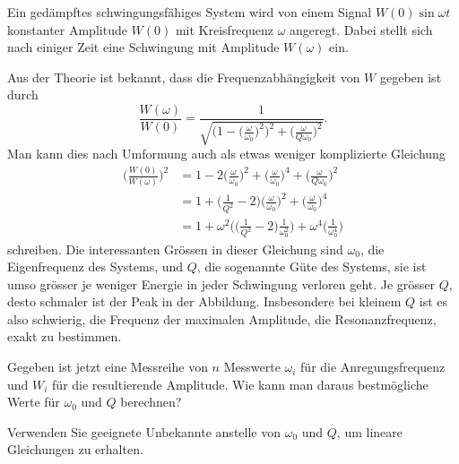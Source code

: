 Ein gedämpftes schwingungsfähiges System wird von einem Signal
$W(0)\sin\omega t$
konstanter Amplitude $W(0)$ mit Kreisfrequenz $\omega$ angeregt.
Dabei stellt sich nach einiger Zeit eine Schwingung mit Amplitude $W(\omega)$
ein.
\begin{center}
\end{center}
Aus der Theorie ist bekannt, dass die Frequenzabhängigkeit von $W$
gegeben ist durch
\begin{equation}
\frac{W(\omega)}{W(0)}
=
\frac{1}{\sqrt{\biggl(1-\biggl(\displaystyle\frac{\omega}{\omega_0}\biggr)^2\biggr)^2
+
\biggl(\displaystyle\frac{\omega}{Q\omega_0}\biggr)^2}}.
\end{equation}
Man kann dies nach Umformung auch als etwas weniger komplizierte Gleichung
\begin{equation}
\begin{aligned}
\biggl(
\frac{W(0)}{W(\omega)}
\biggr)^2
&=
1
-
2 \biggl(\frac{\omega}{\omega_0}\biggr)^2
+
\biggl(\frac{\omega}{\omega_0}\biggr)^4
+
\biggl(\frac{\omega}{Q\omega_0}\biggr)^2
\\
&=
1
+
\biggl(
\frac{1}{Q^2}
-
2\biggr)\biggl(\frac{\omega}{\omega_0}\biggr)^2
+
\biggl(\frac{\omega}{\omega_0}\biggr)^4
\\
&=
1
+
\omega^2
\biggl(\biggl(\frac{1}{Q^2}-2\biggr)\frac{1}{\omega_0^2}\biggr)
+
\omega^4
\biggl(\frac{1}{\omega_0^4}\biggr)
\end{aligned}
\label{60000027:eqn}
\end{equation}
schreiben.
Die interessanten Grössen in dieser Gleichung sind $\omega_0$, die 
Eigenfrequenz des Systems, und $Q$, die sogenannte Güte des Systems,
sie ist umso grösser je weniger Energie in jeder Schwingung verloren geht.
Je grösser $Q$, desto schmaler ist der Peak in der Abbildung.
Insbesondere bei kleinem $Q$ ist es also schwierig, die Frequenz der
maximalen Amplitude, die Resonanzfrequenz, exakt zu bestimmen.

Gegeben ist jetzt eine Messreihe von $n$ Messwerte $\omega_i$ für die
Anregungsfrequenz und $W_i$ für die resultierende Amplitude.
Wie kann man daraus bestmögliche Werte für $\omega_0$ und $Q$ berechnen?

\begin{hinweis}
Verwenden Sie geeignete Unbekannte anstelle von $\omega_0$ und $Q$,
um lineare Gleichungen zu erhalten.
\end{hinweis}


